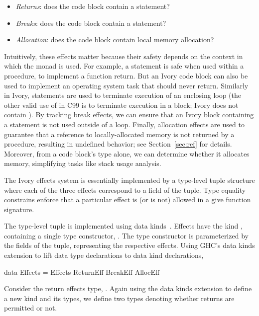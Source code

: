 \begin{itemize}
\item \emph{Returns}: does the code block contain a  statement?
\item \emph{Breaks}: does the code block contain a  statement?
\item \emph{Allocation}: does the code block contain local memory allocation?
\end{itemize}

Intuitively, these effects matter because their safety depends on the context in
which the monad is used. For example, a  statement is safe when used
within a procedure, to implement a function return. But an Ivory code block can
also be used to implement an operating system task that should never
return. Similarly in Ivory,  statements are used to terminate
execution of an enclosing loop (the other valid use of  in C99 is to
terminate execution in a  block; Ivory does not contain
). By tracking break effects, we can ensure that an Ivory block
containing a  statement is not used outside of a loop. Finally,
allocation effects are used to guarantee that a reference to locally-allocated
memory is not returned by a procedure, resulting in undefined behavior; see
Section~\ref{sec:ref} for details. Moreover, from a code block's type alone, we
can determine whether it allocates memory, simplifying tasks like stack usage
analysis.

The Ivory effects system is essentially implemented by a type-level tuple
structure where each of the three effects correspond to a field of the
tuple. Type equality constrains enforce that a particular effect is (or is not)
allowed in a give function signature.

The type-level tuple is implemented using data kinds~\cite{data-kinds}. Effects have the
kind , containing a single type constructor, . The type
constructor  is parameterized by the fields of the tuple,
representing the respective effects. Using GHC's data kinds extension to lift
data type declarations to data kind declarations,
\begin{code}
data Effects = Effects ReturnEff BreakEff AllocEff
\end{code}

\noindent
Consider the return effects type, .  Again using the data kinds
extension to define a new kind and its types, we define two types denoting
whether returns are permitted or not.

